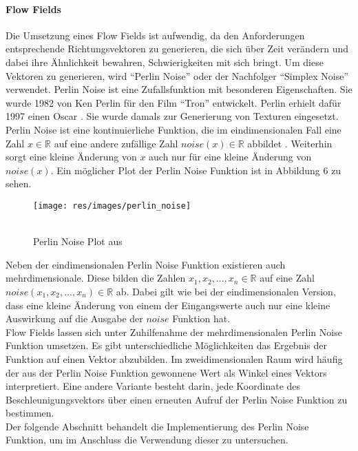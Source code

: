 \documentclass[11pt,a4paper]{article}
\begin{document}
\paragraph{Flow Fields}
Die Umsetzung eines Flow Fields ist aufwendig, da den Anforderungen entsprechende Richtungsvektoren zu generieren, die sich über Zeit verändern und dabei ihre Ähnlichkeit bewahren, Schwierigkeiten mit sich bringt. Um diese Vektoren zu generieren, wird ``Perlin Noise'' oder der Nachfolger ``Simplex Noise'' verwendet. Perlin Noise ist eine Zufallsfunktion mit besonderen Eigenschaften. Sie wurde 1982 von Ken Perlin für den Film ``Tron'' entwickelt. Perlin erhielt dafür 1997 einen Oscar \cite{bcc7190da8e90284b4e790817b8eed4ee3ea6cffbe5a23ef07a000ca5628ffbc}. Sie wurde damals zur Generierung von Texturen eingesetzt.\\
Perlin Noise ist eine kontinuierliche Funktion, die im  eindimensionalen Fall eine Zahl $x \in \mathbb{R}$ auf eine andere zufällige Zahl $noise(x) \in \mathbb{R}$ abbildet \cite{25a05da283ffd9d4bdda94c308ccf3a8759f22373b368f895cbef2e9186ab646}. Weiterhin sorgt eine kleine Änderung von $x$ auch nur für eine kleine Änderung von $noise(x)$. Ein möglicher Plot der Perlin Noise Funktion ist in Abbildung 6 zu sehen.
\begin{SCfigure}[][h]
\hspace{110pt}
\texttt{[image: res/images/perlin\_noise]}
\caption[Perlin Noise Plot]{\\Perlin Noise Plot aus \cite[Kap.\\Introduction]{nature_of_code}}
\end{SCfigure}
\noindent
Neben der eindimensionalen Perlin Noise Funktion existieren auch mehrdimensionale. Diese bilden die Zahlen $x_1, x_2, ..., x_n \in \mathbb{R}$ auf eine Zahl $noise(x_1, x_2, ..., x_n) \in \mathbb{R}$ ab. Dabei gilt wie bei der eindimensionalen Version, dass eine kleine Änderung von einem der Eingangswerte auch nur eine kleine Auswirkung auf die Ausgabe der $noise$ Funktion hat.\\
Flow Fields lassen sich unter Zuhilfenahme der mehrdimensionalen Perlin Noise Funktion umsetzen. Es gibt unterschiedliche Möglichkeiten das Ergebnis der Funktion auf einen Vektor abzubilden. Im zweidimensionalen Raum wird häufig der aus der Perlin Noise Funktion gewonnene Wert als Winkel eines Vektors interpretiert. Eine andere Variante besteht darin,  jede Koordinate des Beschleunigungsvektors über einen erneuten Aufruf der Perlin Noise Funktion zu bestimmen.\\
Der folgende Abschnitt behandelt die Implementierung des Perlin Noise Funktion, um im Anschluss die Verwendung dieser zu untersuchen.
\end{document}
